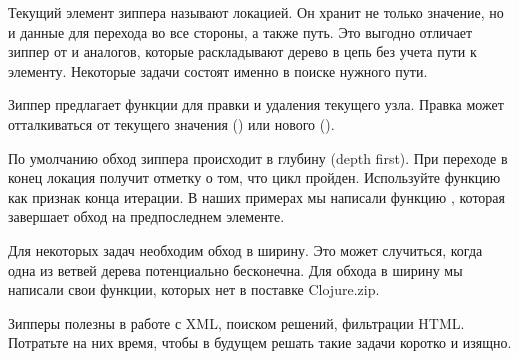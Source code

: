 Текущий элемент зиппера называют локацией. Он хранит не только значение, но и
данные для перехода во все стороны, а также путь. Это выгодно отличает зиппер от
 и аналогов, которые раскладывают дерево в цепь без учета пути к
элементу. Некоторые задачи состоят именно в поиске нужного пути.

Зиппер предлагает функции для правки и удаления текущего узла. Правка может
отталкиваться от текущего значения () или нового ().

По умолчанию обход зиппера происходит в глубину (depth first). При переходе в
конец локация получит отметку о том, что цикл пройден. Используйте функцию
 как признак конца итерации. В наших примерах мы написали функцию
, которая завершает обход на предпоследнем элементе.

Для некоторых задач необходим обход в ширину. Это может случиться, когда одна из
ветвей дерева потенциально бесконечна. Для обхода в ширину мы написали свои
функции, которых нет в поставке Clojure.zip.

Зипперы полезны в работе с XML, поиском решений, фильтрации HTML. Потратьте на
них время, чтобы в будущем решать такие задачи коротко и изящно.
